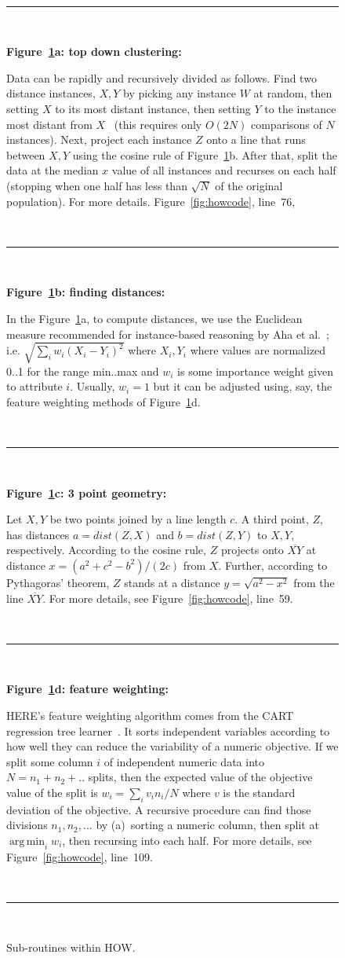 \documentclass[conference]{IEEEtran}
\newcommand{\fig}[1]{Figure~\ref{fig:#1}}
\DeclareMathOperator*{\argmin}{arg\,min}
\begin{document}
\begin{figure}[t!]
\small
~\hrule~

{\bf \fig{where}a: top down clustering:}

Data can be rapidly and recursively divided   as follows.
Find   two   distance instances,  $X,Y$
by picking any instance $W$ at random, then setting $X$ to its most
distant instance, then setting $Y$ to the instance most distant from
$X$~\cite{fastmap}
(this requires only $O(2N)$ comparisons
of $N$ instances).
Next, project each instance $Z$
onto a line that  runs between $X,Y$ using the cosine
rule of \fig{where}b. After that,  split the data at the median $x$ value of all instances and
recurses on each half  (stopping when
one half has less  than $\sqrt{N}$ of the original population). For more details. \fig{howcode}, line~76, 

~\hrule~
 
{\bf \fig{where}b: finding distances:}

In the \fig{where}a, to compute distances, we use
the Euclidean measure recommended for
instance-based reasoning by Aha et al.~\cite{aha91};
i.e. $\sqrt{\sum_iw_i(X_i-Y_i)^2}$ where $X_i,Y_i$
where values are  normalized 0..1 for the range min..max and 
$w_i$ is some importance weight given to attribute $i$.
Usually, $w_i=1$ but it can be adjusted using, say,
the feature weighting methods of \fig{where}d. 
 
 ~\hrule~
 
{\bf \fig{where}c: 3 point geometry:}
 
Let   $X,Y$ be two points joined by  a line  length $c$.
A third point, $Z$, has distances  $a=dist(Z,X)$ and
$b=dist(Z,Y)$ to $X,Y$, respectively.
According to the cosine rule,   $Z$ projects onto  $\overline{XY}$
at distance $x=(a^2 + c^2 - b^2)/(2c)$ from $X$.
Further, according to Pythagoras' theorem, $Z$ stands at a distance
$y = \sqrt{a^2 - x^2}$ from the line $\overline{XY}$. For more details, see  \fig{howcode}, line~59.

~\hrule~

{\bf \fig{where}d: feature weighting:}

HERE's feature weighting algorithm
comes from the CART regression tree learner~\cite{Breiman1984}.
It sorts independent variables
 according to how well they can reduce the variability
of a  numeric objective.
If we split some column $i$ of independent numeric data  into $N=n_1 + n_2 + ..$ splits,
then the expected
value of the objective value of the split  is $w_i = \sum_i v_in_i/N$
where $v$ is the standard deviation of the objective.
A recursive procedure can  find those divisions $n_1,n_2,...$ by (a)~sorting a numeric column,
then split at $\argmin_i w_i$, then recursing into each half.  For more details, see  \fig{howcode}, line~109.

~\hrule~
 
\caption{Sub-routines within HOW.}\label{fig:where}
\end{figure}
\end{document}
